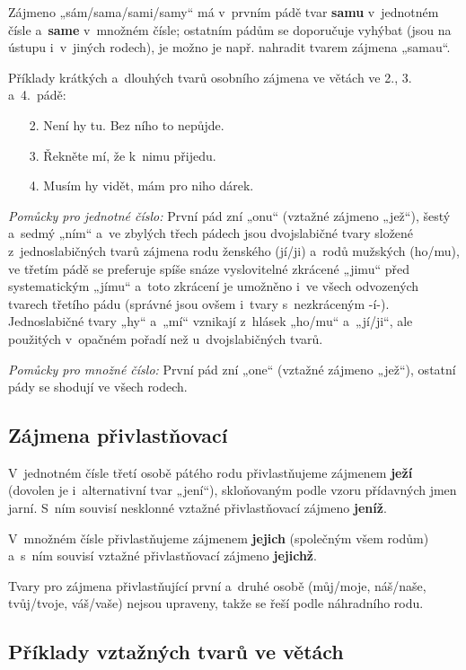 Zájmeno „sám/sama/sami/samy“ má v prvním pádě tvar \textbf{samu}
v jednotném čísle a \textbf{same} v množném čísle;
ostatním pádům se doporučuje vyhýbat (jsou na ústupu i v jiných rodech),
je možno je např. nahradit tvarem zájmena „samau“.

Příklady krátkých a dlouhých tvarů osobního zájmena ve větách
ve 2., 3. a 4. pádě:

\begin{enumerate}[noitemsep]
\item[2.]Není hy tu. Bez ního to nepůjde.
\item[3.]Řekněte mí, že k nimu přijedu.
\item[4.]Musím hy vidět, mám pro niho dárek.
\end{enumerate}

\emph{Pomůcky pro jednotné číslo:} První pád zní „onu“ (vztažné zájmeno „jež“),
šestý a sedmý „ním“ a ve zbylých třech pádech jsou dvojslabičné tvary
složené z jednoslabičných tvarů zájmena rodu ženského (jí/ji)
a rodů mužských (ho/mu), ve třetím pádě se preferuje spíše snáze
vyslovitelné zkrácené „jimu“ před systematickým „jímu“ a toto zkrácení
je umožněno i ve všech odvozených tvarech třetího pádu (správné jsou
ovšem i tvary s nezkráceným -í-).
Jednoslabičné tvary „hy“ a „mí“ vznikají z hlásek „ho/mu“ a „jí/ji“,
ale použitých v opačném pořadí než u dvojslabičných tvarů.

\emph{Pomůcky pro množné číslo:} První pád zní „one“
(vztažné zájmeno „jež“), ostatní pády se shodují ve všech rodech.

\subsection{Zájmena přivlastňovací}

V jednotném čísle třetí osobě pátého rodu přivlastňujeme zájmenem \textbf{ježí}
(dovolen je i alternativní tvar „jení“), skloňovaným podle vzoru přídavných jmen jarní.
S ním souvisí nesklonné vztažné přivlastňovací zájmeno \textbf{jeníž}.

V množném čísle přivlastňujeme zájmenem \textbf{jejich} (společným všem rodům)
a s ním souvisí vztažné přivlastňovací zájmeno \textbf{jejichž}.

Tvary pro zájmena přivlastňující první a druhé osobě (můj/moje,
náš/naše, tvůj/tvoje, váš/vaše) nejsou upraveny, takže se řeší
podle náhradního rodu.

\subsection{Příklady vztažných tvarů ve větách}

